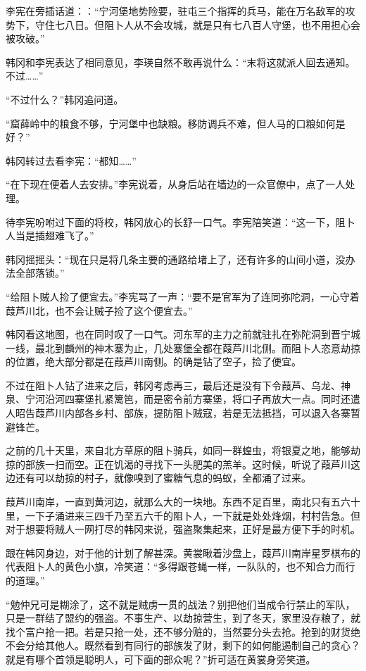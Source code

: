 李宪在旁插话道：：“宁河堡地势险要，驻屯三个指挥的兵马，能在万名敌军的攻势下，守住七八日。但阻卜人从不会攻城，就是只有七八百人守堡，也不用担心会被攻破。”

韩冈和李宪表达了相同意见，李瑛自然不敢再说什么：“末将这就派人回去通知。不过……”

“不过什么？”韩冈追问道。

“窟薛岭中的粮食不够，宁河堡中也缺粮。移防调兵不难，但人马的口粮如何是好？”

韩冈转过去看李宪：“都知……”

“在下现在便着人去安排。”李宪说着，从身后站在墙边的一众官僚中，点了一人处理。

待李宪吩咐过下面的将校，韩冈放心的长舒一口气。李宪陪笑道：“这一下，阻卜人当是插翅难飞了。”

韩冈摇摇头：“现在只是将几条主要的通路给堵上了，还有许多的山间小道，没办法全部落锁。”

“给阻卜贼人捡了便宜去。”李宪骂了一声：“要不是官军为了连同弥陀洞，一心守着葭芦川北，也不会让贼子捡了这个便宜去。”

韩冈看这地图，也在同时叹了一口气。河东军的主力之前就驻扎在弥陀洞到晋宁城一线，最北到麟州的神木寨为止，几处寨堡全都在葭芦川北侧。而阻卜人恣意劫掠的位置，绝大部分都是在葭芦川南侧。的确是钻了空子，捡了便宜。

不过在阻卜人钻了进来之后，韩冈考虑再三，最后还是没有下令葭芦、乌龙、神泉、宁河沿河四寨堡扎紧篱笆，而是密令前方寨堡，将口子再放大一点。同时还遣人昭告葭芦川内部各乡村、部族，提防阻卜贼寇，若是无法抵挡，可以退入各寨暂避锋芒。

之前的几十天里，来自北方草原的阻卜骑兵，如同一群蝗虫，将银夏之地，能够劫掠的部族一扫而空。正在饥渴的寻找下一头肥美的羔羊。这时候，听说了葭芦川这边还有可以劫掠的村子，就像嗅到了蜜糖气息的蚂蚁，全都涌了过来。

葭芦川南岸，一直到黄河边，就那么大的一块地。东西不足百里，南北只有五六十里，一下子涌进来三四千乃至五六千的阻卜人，一下就是处处烽烟，村村告急。但对于想要将贼人一网打尽的韩冈来说，强盗聚集起来，正好是最方便下手的时机。

跟在韩冈身边，对于他的计划了解甚深。黄裳瞅着沙盘上，葭芦川南岸星罗棋布的代表阻卜人的黄色小旗，冷笑道：“多得跟苍蝇一样，一队队的，也不知合力而行的道理。”

“勉仲兄可是糊涂了，这不就是贼虏一贯的战法？别把他们当成令行禁止的军队，只是一群结了盟约的强盗。不事生产、以劫掠营生，到了冬天，家里没存粮了，就找个富户抢一把。若是只抢一处，还不够分赃的，当然要分头去抢。抢到的财货绝不会分给其他人。既然看到有同行的部族发了财，剩下的如何能遏制自己的贪心？就是有哪个首领是聪明人，可下面的部众呢？”折可适在黄裳身旁笑道。

